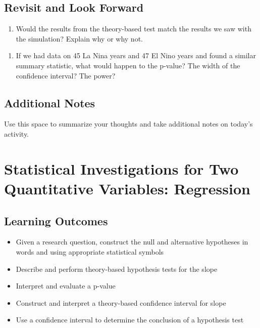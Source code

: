 \documentclass[
]{report}
\providecommand{\tightlist}{%
  \setlength{\itemsep}{0pt}\setlength{\parskip}{0pt}}
\begin{document}
\vspace{3in}

\hypertarget{revisit-and-look-forward}{%
\section{Revisit and Look Forward}\label{revisit-and-look-forward}}

\begin{enumerate}
\def\labelenumi{\arabic{enumi}.}
\setcounter{enumi}{19}
\tightlist
\item
  Would the results from the theory-based test match the results we saw with the simulation? Explain why or why not.
\end{enumerate}

\vspace{1in}

\begin{enumerate}
\def\labelenumi{\arabic{enumi}.}
\setcounter{enumi}{20}
\tightlist
\item
  If we had data on 45 La Nina years and 47 El Nino years and found a similar summary statistic, what would happen to the p-value? The width of the confidence interval? The power?
\end{enumerate}

\vspace{1in}

\hypertarget{additional-notes}{%
\section{Additional Notes}\label{additional-notes}}

Use this space to summarize your thoughts and take additional notes on today's activity.

\hypertarget{statistical-investigations-for-two-quantitative-variables-regression}{%
\chapter{Statistical Investigations for Two Quantitative Variables: Regression}\label{statistical-investigations-for-two-quantitative-variables-regression}}

\hypertarget{learning-outcomes}{%
\section{Learning Outcomes}\label{learning-outcomes}}

\begin{itemize}
\item
  Given a research question, construct the null and alternative hypotheses
  in words and using appropriate statistical symbols
\item
  Describe and perform theory-based hypothesis tests for the slope
\item
  Interpret and evaluate a p-value
\item
  Construct and interpret a theory-based confidence interval for slope
\item
  Use a confidence interval to determine the conclusion of a hypothesis test
\end{itemize}
\end{document}
